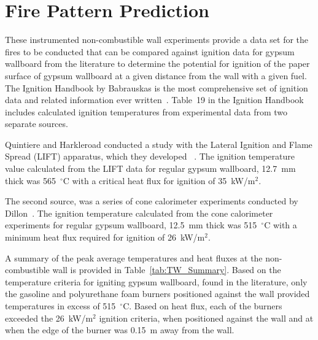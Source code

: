 \documentclass[twoside]{uocthesis}
\begin{document}
{\section{Fire Pattern Prediction}

These instrumented non-combustible wall experiments provide a data set for the fires to be conducted that can be compared against ignition data for gypsum wallboard from the literature to determine the potential for ignition of the paper surface of gypsum wallboard at a given distance from the wall with a given fuel. The Ignition Handbook by Babrauskas is the most comprehensive set of ignition data and related information ever written~\cite{Babrauskas:2003}.  Table~19 in the Ignition Handbook includes calculated ignition temperatures from experimental data from two separate sources.

Quintiere and Harkleroad conducted a study with the Lateral Ignition and Flame Spread (LIFT) apparatus, which they developed ~\cite{ASTM_E1321,Quintiere:1985}.
The ignition temperature value calculated from the LIFT data for regular gypsum wallboard, 12.7~mm thick was 565~$^{\circ}$C with a critical heat flux for ignition of 35~kW/m$^2$.

The second source, was a series of cone calorimeter experiments conducted by Dillon~\cite{ASTM_E1354,Dillon:1998}. The ignition temperature calculated from the cone calorimeter experiments for regular gypsum wallboard, 12.5~mm thick was 515~$^{\circ}$C with a minimum heat flux required for ignition of 26~kW/m$^2$.

A summary of the peak average temperatures and heat fluxes at the non-combustible wall is provided in Table~\ref{tab:TW_Summary}.   Based on the temperature criteria for igniting gypsum wallboard, found in the literature, only the gasoline and polyurethane foam burners positioned against the wall provided temperatures in excess of 515~$^{\circ}$C.  Based on heat flux, each of the burners exceeded the 26~kW/m$^2$ ignition criteria, when positioned against the wall and at when the edge of the burner was 0.15~m away from the wall.  

}
\end{document}
